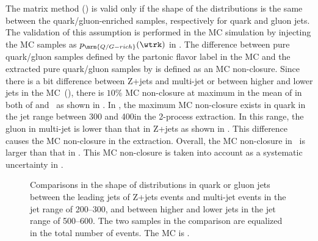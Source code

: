 The matrix method () is valid only if the shape of the \wtrk distributions is the same between the quark/gluon-enriched samples, %
respectively for quark and gluon jets. %
The validation of this assumption is performed in the MC simulation by injecting the MC samples as $p_{\mrm{Q/G-rich}}(\wtrk)$ in . %
The difference between pure quark/gluon samples defined by the partonic flavor label in the MC %
and the extracted pure quark/gluon samples by  is defined as an MC non-closure. %
Since there is a bit difference between Z+jets and multi-jet or between higher \abseta and lower \abseta jets in the MC~(), %
there is $10\%$ MC non-closure at maximum in the mean of \wtrk in both of  and \sherpa~as shown in . %
In , the maximum MC non-closure exists in quark \wtrk in the jet \pt range between 300 and 400\GeV in the 2-process extraction. %
In this range, the gluon \wtrk in multi-jet is lower than that in Z+jets as shown in . %
This difference causes the MC non-closure in the extraction. %
Overall, the MC non-closure in \sherpa~is larger than that in . %
This MC non-closure is taken into account as a systematic uncertainty in .

\begin{figure}[htb]
  \centering
   \quad
  \caption[]{
    Comparisons in the shape of \wtrk distributions in quark or gluon jets %
    between  the leading jets of Z+jets events and multi-jet events in the jet \pt range of 200--300\GeV, and %
    between  higher \abseta and lower \abseta jets in the jet \pt range of 500--600\GeV. %
    The two samples in the comparison are equalized in the total number of events. %
    The MC is .
    \label{fig:QG-WtrkMC}
    }
\end{figure}


